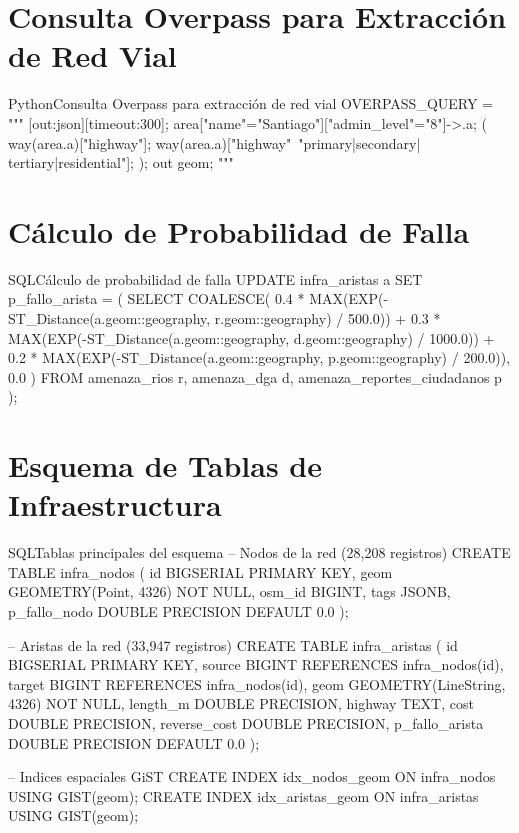 \documentclass[conference]{IEEEtran}
\begin{document}
\appendix

\section{Consulta Overpass para Extracción de Red Vial}
\label{app:overpass}

\begin{mycode}{Python}{Consulta Overpass para extracción de red vial}
OVERPASS_QUERY = """
[out:json][timeout:300];
area["name"="Santiago"]["admin_level"="8"]->.a;
(
  way(area.a)["highway"];
  way(area.a)["highway"~"primary|secondary|
              tertiary|residential"];
);
out geom;
"""
\end{mycode}

\section{Cálculo de Probabilidad de Falla}
\label{app:probabilidad}

\begin{mycode}{SQL}{Cálculo de probabilidad de falla}
UPDATE infra_aristas a SET p_fallo_arista = (
    SELECT COALESCE(
        0.4 * MAX(EXP(-ST_Distance(a.geom::geography,
            r.geom::geography) / 500.0)) +
        0.3 * MAX(EXP(-ST_Distance(a.geom::geography,
            d.geom::geography) / 1000.0)) +
        0.2 * MAX(EXP(-ST_Distance(a.geom::geography,
            p.geom::geography) / 200.0)),
        0.0
    )
    FROM amenaza_rios r, amenaza_dga d,
         amenaza_reportes_ciudadanos p
);
\end{mycode}

\section{Esquema de Tablas de Infraestructura}
\label{app:schema}

\begin{mycode}{SQL}{Tablas principales del esquema}
-- Nodos de la red (28,208 registros)
CREATE TABLE infra_nodos (
    id BIGSERIAL PRIMARY KEY,
    geom GEOMETRY(Point, 4326) NOT NULL,
    osm_id BIGINT,
    tags JSONB,
    p_fallo_nodo DOUBLE PRECISION DEFAULT 0.0
);

-- Aristas de la red (33,947 registros)
CREATE TABLE infra_aristas (
    id BIGSERIAL PRIMARY KEY,
    source BIGINT REFERENCES infra_nodos(id),
    target BIGINT REFERENCES infra_nodos(id),
    geom GEOMETRY(LineString, 4326) NOT NULL,
    length_m DOUBLE PRECISION,
    highway TEXT,
    cost DOUBLE PRECISION,
    reverse_cost DOUBLE PRECISION,
    p_fallo_arista DOUBLE PRECISION DEFAULT 0.0
);

-- Indices espaciales GiST
CREATE INDEX idx_nodos_geom
    ON infra_nodos USING GIST(geom);
CREATE INDEX idx_aristas_geom
    ON infra_aristas USING GIST(geom);
\end{mycode}
\end{document}
